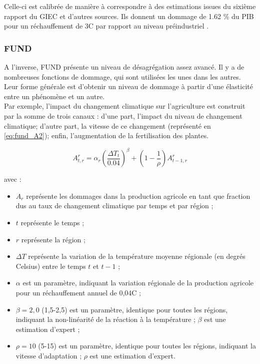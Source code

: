 Celle-ci est calibrée de manière à correspondre à des estimations issues du sixième rapport du GIEC et d'autres sources. Ils donnent un dommage de 1.62 \% du PIB pour un réchauffement de 3\textdegree C par rapport au niveau préindustriel \autocite{barrage_policies_2023, nordhaus_dice_2013}. 

\subsubsection{FUND} 

A l'inverse, FUND présente un niveau de désagrégation assez avancé. Il y a de nombreuses fonctions de dommage, qui sont utilisées les unes dans les autres. Leur forme générale est d'obtenir un niveau de dommage à partir d'une élasticité entre un phénomène et un autre. \\

Par exemple, l'impact du changement climatique sur l'agriculture est construit par la somme de trois canaux : d'une part, l'impact du niveau de changement climatique; d'autre part, la vitesse de ce changement (représenté en \ref{eq:fund_A2}); enfin, l'augmentation de la fertilisation des plantes. 

\begin{equation}
    A_{t,r}^{r}=\alpha_{r}\left(\frac{\Delta T_{t}}{0.04}\right)^{\beta}+\left(1-\frac{1}{\rho}\right)A_{t-1,r}^{r}
    \label{eq:fund_A2}
\end{equation}

avec : 

\begin{itemize}
    \item \(A_r\) représente les dommages dans la production agricole en tant que fraction dus au taux de changement climatique par temps et par région ;
    \item \(t\) représente le temps ;
    \item \(r\) représente la région ;
    \item \(\Delta T\) représente la variation de la température moyenne régionale (en degrés Celsius) entre le temps \(t\) et \(t - 1\) ;
    \item \(\alpha\) est un paramètre, indiquant la variation régionale de la production agricole pour un réchauffement annuel de 0,04\textdegree C ;
    \item \(\beta = 2,0\) (1,5-2,5) est un paramètre, identique pour toutes les régions, indiquant la non-linéarité de la réaction à la température ; \(\beta\) est une estimation d'expert ;
    \item \(\rho = 10\) (5-15) est un paramètre, identique pour toutes les régions, indiquant la vitesse d'adaptation ; \(\rho\) est une estimation d'expert.

\end{itemize}
\vspace{15pt}


